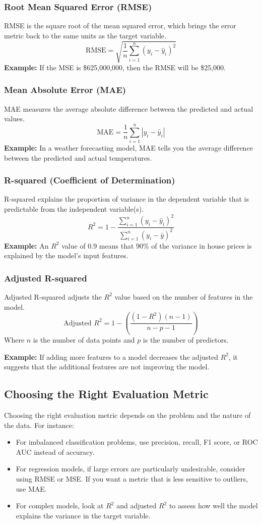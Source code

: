 \documentclass[11pt,spanish]{article}
\begin{document}
\begin{multicols}{2}
\subsubsection{Root Mean Squared Error (RMSE)}
RMSE is the square root of the mean squared error, which brings the error metric back to the same units as the target variable.
\[
\text{RMSE} = \sqrt{\frac{1}{n} \sum_{i=1}^{n} (y_i - \hat{y}_i)^2}
\]
\textbf{Example:} If the MSE is \$625,000,000, then the RMSE will be \$25,000.

\subsubsection{Mean Absolute Error (MAE)}
MAE measures the average absolute difference between the predicted and actual values.
\[
\text{MAE} = \frac{1}{n} \sum_{i=1}^{n} |y_i - \hat{y}_i|
\]
\textbf{Example:} In a weather forecasting model, MAE tells you the average difference between the predicted and actual temperatures.

\subsubsection{R-squared (Coefficient of Determination)}
R-squared explains the proportion of variance in the dependent variable that is predictable from the independent variable(s).
\[
R^2 = 1 - \frac{\sum_{i=1}^{n} (y_i - \hat{y}_i)^2}{\sum_{i=1}^{n} (y_i - \bar{y})^2}
\]
\textbf{Example:} An $R^2$ value of 0.9 means that 90\% of the variance in house prices is explained by the model’s input features.

\subsubsection{Adjusted R-squared}
Adjusted R-squared adjusts the $R^2$ value based on the number of features in the model.
\[
\text{Adjusted } R^2 = 1 - \left( \frac{(1 - R^2)(n - 1)}{n - p - 1} \right)
\]
Where $n$ is the number of data points and $p$ is the number of predictors.

\textbf{Example:} If adding more features to a model decreases the adjusted $R^2$, it suggests that the additional features are not improving the model.

\subsection{Choosing the Right Evaluation Metric}
Choosing the right evaluation metric depends on the problem and the nature of the data. For instance:
\begin{itemize}
    \item For imbalanced classification problems, use precision, recall, F1 score, or ROC AUC instead of accuracy.
    \item For regression models, if large errors are particularly undesirable, consider using RMSE or MSE. If you want a metric that is less sensitive to outliers, use MAE.
    \item For complex models, look at $R^2$ and adjusted $R^2$ to assess how well the model explains the variance in the target variable.
\end{itemize}


\end{multicols}
\end{document}
